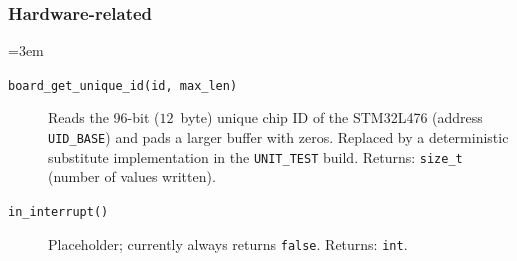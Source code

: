 \subsubsection*{Hardware-related}
{\sloppy\emergencystretch=3em
\begin{description}
\item[\texttt{board\_get\_unique\_id(id, max\_len)}] Reads the 96-bit
  ($12$~byte) unique chip ID of the STM32L476 (address \verb|UID_BASE|) and
  pads a larger buffer with zeros. Replaced by a deterministic substitute
  implementation in the \verb|UNIT_TEST| build. Returns: \verb|size_t| (number
  of values written).
\item[\texttt{in\_interrupt()}] Placeholder; currently always returns
  \verb|false|. Returns: \verb|int|.
\end{description}
\par}
